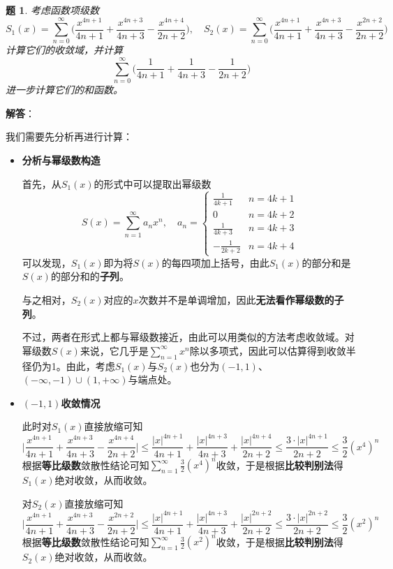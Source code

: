 \documentclass[a4paper,UTF8,fontset=windows,AutoFakeBold]{ctexart}
\newcommand*{\suminf}[1][n=1]{\sum_{#1}^\infty}
\theoremstyle{ex}
\newtheorem{exercise}{题}
\newcommand{\sol}[1]{{\vspace{5pt}\kaishu\noindent\textbf{解答}：\vspace{-3pt}
\begin{compactitem}
    \item[] #1
\end{compactitem}
}}
\begin{document}
\begin{framed}
\begin{exercise}
    考虑函数项级数
    $$S_1(x)=\suminf[n=0]\bigg(\frac{x^{4n+1}}{4n+1}+\frac{x^{4n+3}}{4n+3}-\frac{x^{4n+4}}{2n+2}\bigg),\quad S_2(x)=\suminf[n=0]\bigg(\frac{x^{4n+1}}{4n+1}+\frac{x^{4n+3}}{4n+3}-\frac{x^{2n+2}}{2n+2}\bigg)$$
    计算它们的收敛域，并计算
    $$\suminf[n=0]\bigg(\frac{1}{4n+1}+\frac{1}{4n+3}-\frac{1}{2n+2}\bigg)$$
    进一步计算它们的和函数。
\end{exercise}
\sol{
    我们需要先分析再进行计算：
    \begin{itemize}
        \item \textbf{分析与幂级数构造}
        
        首先，从$S_1(x)$的形式中可以提取出幂级数
        $$S(x)=\suminf a_nx^n,\quad a_n=\begin{cases}\frac{1}{4k+1}&n=4k+1\\0&n=4k+2\\\frac{1}{4k+3}&n=4k+3\\-\frac{1}{2k+2}&n=4k+4\end{cases}$$
        可以发现，$S_1(x)$即为将$S(x)$的每四项加上括号，由此$S_1(x)$的部分和是$S(x)$的部分和的\textbf{子列}。

        与之相对，$S_2(x)$对应的$x$次数并不是单调增加，因此\textbf{无法看作幂级数的子列}。

        不过，两者在形式上都与幂级数接近，由此可以用类似的方法考虑收敛域。对幂级数$S(x)$来说，它几乎是$\suminf x^n$除以多项式，因此可以估算得到收敛半径仍为1。由此，考虑$S_1(x)$与$S_2(x)$也分为$(-1,1)$、$(-\infty,-1)\cup(1,+\infty)$与端点处。

        \item \textbf{$(-1,1)$收敛情况}
        
        此时对$S_1(x)$直接放缩可知
        $$\bigg|\frac{x^{4n+1}}{4n+1}+\frac{x^{4n+3}}{4n+3}-\frac{x^{4n+4}}{2n+2}\bigg|\le\frac{|x|^{4n+1}}{4n+1}+\frac{|x|^{4n+3}}{4n+3}+\frac{|x|^{4n+4}}{2n+2}\le\frac{3\cdot|x|^{4n+1}}{2n+2}\le\frac{3}{2}(x^4)^n$$
        根据\textbf{等比级数}敛散性结论可知$\suminf\frac{3}{2}(x^4)^n$收敛，于是根据\textbf{比较判别法}得$S_1(x)$绝对收敛，从而收敛。

        对$S_2(x)$直接放缩可知
        $$\bigg|\frac{x^{4n+1}}{4n+1}+\frac{x^{4n+3}}{4n+3}-\frac{x^{2n+2}}{2n+2}\bigg|\le\frac{|x|^{4n+1}}{4n+1}+\frac{|x|^{4n+3}}{4n+3}+\frac{|x|^{2n+2}}{2n+2}\le\frac{3\cdot|x|^{2n+2}}{2n+2}\le\frac{3}{2}(x^2)^n$$
        根据\textbf{等比级数}敛散性结论可知$\suminf\frac{3}{2}(x^2)^n$收敛，于是根据\textbf{比较判别法}得$S_2(x)$绝对收敛，从而收敛。
        

\end{itemize}}
\end{framed}
\end{document}
